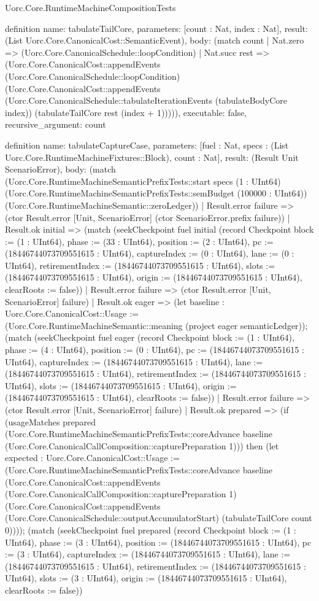 \begin{lexlean}{Uorc.Core.RuntimeMachineCompositionTests}
\begin{semanticmodule}
definition{
  name: tabulateTailCore,
  parameters: [count : Nat, index : Nat],
  result: (List Uorc.Core.CanonicalCost::SemanticEvent),
  body: (match count
    | Nat.zero => (Uorc.Core.CanonicalSchedule::loopCondition)
    | Nat.succ rest => (Uorc.Core.CanonicalCost::appendEvents (Uorc.Core.CanonicalSchedule::loopCondition) (Uorc.Core.CanonicalCost::appendEvents (Uorc.Core.CanonicalSchedule::tabulateIterationEvents (tabulateBodyCore index)) (tabulateTailCore rest (index + 1))))),
  executable: false,
  recursive_argument: count
}

definition{
  name: tabulateCaptureCase,
  parameters: [fuel : Nat, specs : (List Uorc.Core.RuntimeMachineFixtures::Block), count : Nat],
  result: (Result Unit ScenarioError),
  body: (match (Uorc.Core.RuntimeMachineSemanticPrefixTests::start specs (1 : UInt64) (Uorc.Core.RuntimeMachineSemanticPrefixTests::semBudget (100000 : UInt64)) (Uorc.Core.RuntimeMachineSemantic::zeroLedger))
    | Result.error failure => (ctor Result.error [Unit, ScenarioError] (ctor ScenarioError.prefix failure))
    | Result.ok initial => (match (seekCheckpoint fuel initial (record Checkpoint {block := (1 : UInt64), phase := (33 : UInt64), position := (2 : UInt64), pc := (18446744073709551615 : UInt64), captureIndex := (0 : UInt64), lane := (0 : UInt64), retirementIndex := (18446744073709551615 : UInt64), slots := (18446744073709551615 : UInt64), origin := (18446744073709551615 : UInt64), clearRoots := false}))
      | Result.error failure => (ctor Result.error [Unit, ScenarioError] failure)
      | Result.ok eager => (let baseline : Uorc.Core.CanonicalCost::Usage := (Uorc.Core.RuntimeMachineSemantic::meaning (project eager semanticLedger)); (match (seekCheckpoint fuel eager (record Checkpoint {block := (1 : UInt64), phase := (4 : UInt64), position := (0 : UInt64), pc := (18446744073709551615 : UInt64), captureIndex := (18446744073709551615 : UInt64), lane := (18446744073709551615 : UInt64), retirementIndex := (18446744073709551615 : UInt64), slots := (18446744073709551615 : UInt64), origin := (18446744073709551615 : UInt64), clearRoots := false}))
        | Result.error failure => (ctor Result.error [Unit, ScenarioError] failure)
        | Result.ok prepared => (if (usageMatches prepared (Uorc.Core.RuntimeMachineSemanticPrefixTests::coreAdvance baseline (Uorc.Core.CanonicalCallComposition::capturePreparation 1))) then (let expected : Uorc.Core.CanonicalCost::Usage := (Uorc.Core.RuntimeMachineSemanticPrefixTests::coreAdvance baseline (Uorc.Core.CanonicalCost::appendEvents (Uorc.Core.CanonicalCallComposition::capturePreparation 1) (Uorc.Core.CanonicalCost::appendEvents (Uorc.Core.CanonicalSchedule::outputAccumulatorStart) (tabulateTailCore count 0)))); (match (seekCheckpoint fuel prepared (record Checkpoint {block := (1 : UInt64), phase := (3 : UInt64), position := (18446744073709551615 : UInt64), pc := (3 : UInt64), captureIndex := (18446744073709551615 : UInt64), lane := (18446744073709551615 : UInt64), retirementIndex := (18446744073709551615 : UInt64), slots := (3 : UInt64), origin := (18446744073709551615 : UInt64), clearRoots := false}))
}
\end{semanticmodule}
\end{lexlean}
